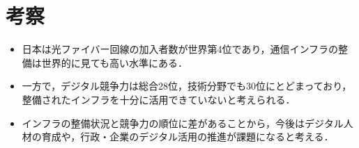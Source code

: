 \documentclass[a4paper,11pt,dvipdfmx]{ujarticle}
\begin{document}
\section{考察}

\begin{itemize}
    \item 日本は光ファイバー回線の加入者数が世界第4位であり，通信インフラの整備は世界的に見ても高い水準にある．
    \item 一方で，デジタル競争力は総合28位，技術分野でも30位にとどまっており，整備されたインフラを十分に活用できていないと考えられる．
    \item インフラの整備状況と競争力の順位に差があることから，今後はデジタル人材の育成や，行政・企業のデジタル活用の推進が課題になると考える．
\end{itemize}



\end{document}
